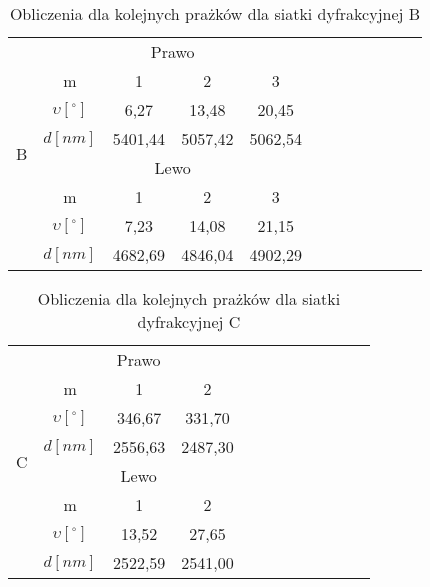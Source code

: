 \documentclass{article}
\begin{document}
\begin{table}[!ht]
    \centering
    \begin{tabular}{|c|c|c|c|c|c|c|c|c|c|c|c|}
    \hline
        \multirow{8}{*}{B}
        & \multicolumn{4}{|c|}{Prawo} \\\cline{2-5}
        & m & 1 & 2 & 3 \\ \cline{2-5}
        & $\upsilon[^\circ]$ &  6,27 & 13,48 & 20,45 \\ \cline{2-5}
        & $d[nm]$ &5401,44 & 5057,42 & 5062,54      \\ \cline{2-5}
        & \multicolumn{4}{|c|}{Lewo}                \\ \cline{2-5}
        & m & 1 & 2 & 3                             \\ \cline{2-5}
        & $\upsilon[^\circ]$ &7,23 & 14,08 & 21,15  \\ \cline{2-5}
        & $d[nm]$ &4682,69 & 4846,04 & 4902,29      \\ \hline
    \end{tabular}
    \caption{Obliczenia dla kolejnych prażków dla siatki dyfrakcyjnej B}
\end{table}

\begin{table}[!ht]
    \centering
    \begin{tabular}{|c|c|c|c|c|c|c|c|c|c|c|c|}
    \hline
        \multirow{8}{*}{C}
        & \multicolumn{3}{|c|}{Prawo} \\\cline{2-4}
        & m & 1 & 2 \\ \cline{2-4}
        & $\upsilon[^\circ]$ & 346,67 & 331,70 \\ \cline{2-4}
        & $d[nm]$ & 2556,63 & 2487,30         \\ \cline{2-4}
        & \multicolumn{3}{|c|}{Lewo}                \\ \cline{2-4}
        & m & 1 & 2                            \\ \cline{2-4}
        & $\upsilon[^\circ]$ & 13,52 & 27,65  \\ \cline{2-4}
        & $d[nm]$ & 2522,59 & 2541,00  \\ \hline
    \end{tabular}
    \caption{Obliczenia dla kolejnych prażków dla siatki dyfrakcyjnej C}
\end{table}     
\end{document}
